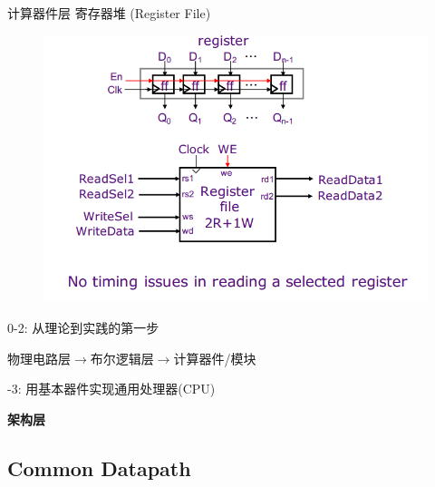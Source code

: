 \documentclass{myslide}
\begin{document}
\begin{frame}{计算器件层}
寄存器堆 (Register File)
\begin{figure}
\centering
\includegraphics[width=0.8\linewidth]{fig/Lecture2/register_files.PNG}
\end{figure}
\end{frame}

\begin{frame}
0-2: 从理论到实践的第一步
\begin{center}
物理电路层$\to$布尔逻辑层$\to$计算器件/模块
\end{center}
-3: 用基本器件实现通用处理器(CPU)
\begin{center}
\Large\textbf{架构层}
\end{center}
\end{frame}

\subsection{Common Datapath}
\begin{frame}
\subsectionpage
\end{frame}
\end{document}

